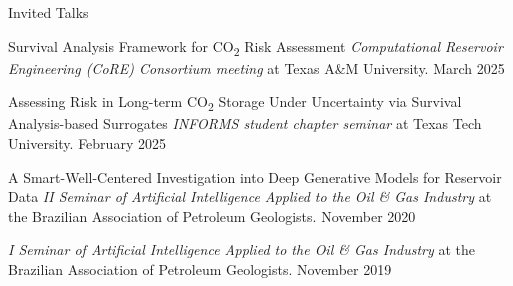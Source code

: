 \begin{cvcontentsection}{Invited Talks}

\cvtalk
    {Survival Analysis Framework for CO\textsubscript{2} Risk Assessment}
    {\textit{Computational Reservoir Engineering (CoRE) Consortium meeting} at Texas A\&M University.}
    {March 2025}

\cvtalk
    {Assessing Risk in Long-term CO\textsubscript{2} Storage Under Uncertainty via Survival Analysis-based Surrogates}
    {\textit{INFORMS student chapter seminar} at Texas Tech University.}
    {February 2025}

\cvtalk
    {A Smart-Well-Centered Investigation into Deep Generative Models for Reservoir Data}
    {\textit{II Seminar of Artificial Intelligence Applied to the Oil \& Gas Industry} at the Brazilian Association of Petroleum Geologists.}
    {November 2020}

    {\textit{I Seminar of Artificial Intelligence Applied to the Oil \& Gas Industry} at the Brazilian Association of Petroleum Geologists.}
    {November 2019}

\end{cvcontentsection}
